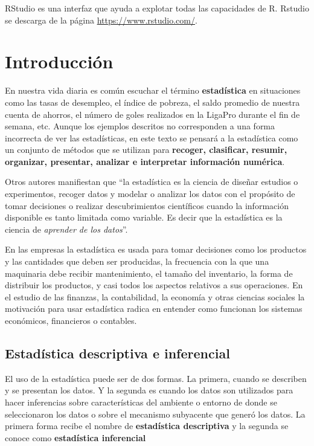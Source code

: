 \documentclass[letterpaper,]{book}
\begin{document}
RStudio es una interfaz que ayuda a explotar todas las capacidades de R. Rstudio se descarga de la página \url{https://www.rstudio.com/}.

\hypertarget{intro}{%
\chapter{Introducción}\label{intro}}

En nuestra vida diaria es común escuchar el término \textbf{estadística} en situaciones como las tasas de desempleo, el índice de pobreza, el saldo promedio de nuestra cuenta de ahorros, el número de goles realizados en la LigaPro durante el fin de semana, etc. Aunque los ejemplos descritos no corresponden a una forma incorrecta de ver las estadísticas, en este texto se pensará a la estadística como un conjunto de métodos que se utilizan para \textbf{recoger, clasificar, resumir, organizar, presentar, analizar e interpretar información numérica}.

Otros autores manifiestan que ``la estadística es la ciencia de diseñar estudios o experimentos, recoger datos y modelar o analizar los datos con el propósito de tomar decisiones o realizar descubrimientos científicos cuando la información disponible es tanto limitada como variable. Es decir que la estadística es la ciencia de \emph{aprender de los datos}''.

En las empresas la estadística es usada para tomar decisiones como los productos y las cantidades que deben ser producidas, la frecuencia con la que una maquinaria debe recibir mantenimiento, el tamaño del inventario, la forma de distribuir los productos, y casi todos los aspectos relativos a sus operaciones. En el estudio de las finanzas, la contabilidad, la economía y otras ciencias sociales la motivación para usar estadística radica en entender como funcionan los sistemas económicos, financieros o contables.

\hypertarget{estypes}{%
\section{Estadística descriptiva e inferencial}\label{estypes}}

El uso de la estadística puede ser de dos formas. La primera, cuando se describen y se presentan los datos. Y la segunda es cuando los datos son utilizados para hacer inferencias sobre características del ambiente o entorno de donde se seleccionaron los datos o sobre el mecanismo subyacente que generó los datos. La primera forma recibe el nombre de \textbf{estadística descriptiva} y la segunda se conoce como \textbf{estadística inferencial}
\end{document}
